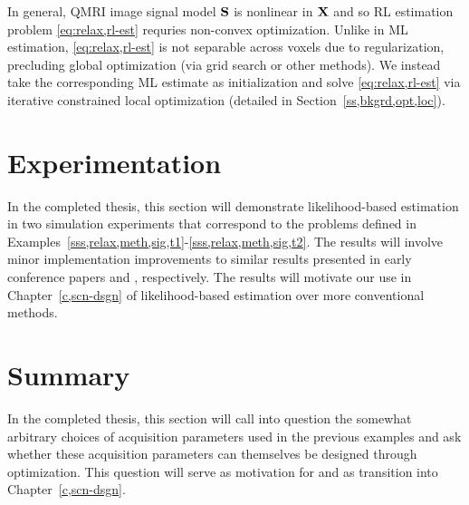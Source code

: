 In general, 
QMRI image signal model $\mathbf{S}$ is nonlinear in $\mathbf{X}$
and so RL estimation problem \eqref{eq:relax,rl-est}
requries non-convex optimization.
Unlike in ML estimation,
\eqref{eq:relax,rl-est} is not separable across voxels
due to regularization, 
precluding global optimization
(via grid search or other methods).
We instead take the corresponding ML estimate
as initialization
and solve \eqref{eq:relax,rl-est} 
via iterative constrained local optimization
(detailed in Section~\ref{ss,bkgrd,opt,loc}).


\section{Experimentation}
\label{s,relax,exp}

In the completed thesis,
this section will demonstrate likelihood-based estimation
in two simulation experiments
that correspond to the problems
defined in Examples~\ref{sss,relax,meth,sig,t1}-\ref{sss,relax,meth,sig,t2}.
The results will involve minor implementation improvements
to similar results presented 
in early conference papers 
\cite{nataraj:14:rje} and \cite{nataraj:14:mbe},
respectively.
The results will motivate our use 
in Chapter~\ref{c,scn-dsgn}
of likelihood-based estimation
over more conventional methods.

\section{Summary}
\label{s,relax,summ}

In the completed thesis,
this section will call into question
the somewhat arbitrary choices
of acquisition parameters 
used in the previous examples
and ask whether these acquisition parameters
can themselves be designed 
through optimization.
This question will serve 
as motivation for 
and as transition into Chapter~\ref{c,scn-dsgn}.
